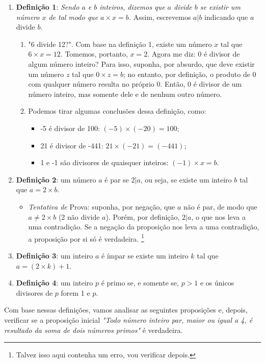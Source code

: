 \documentclass{article}
\begin{document}
\begin{enumerate}
    \item \textbf{Definição 1}: \emph{Sendo $a$ e $b$ inteiros, dizemos que $a$ divide $b$ se existir um número $x$ de tal modo que $ a \times x = b $.} Assim, escrevemos $a|b$ indicando que $a$ divide $b$.
    \begin{enumerate}
    \item "6 divide 12?". Com base na definição 1, existe um número $x$ tal que $6 \times x = 12$. Tomemos, portanto, $x = 2$. Agora me diz: 0 é divisor de algum número inteiro? Para isso, suponha, por absurdo, que deve existir um número $z$ tal que $ 0 \times z = b$; no entanto, por definição, o produto de 0 com qualquer número resulta no próprio 0. Então, 0 é divisor de um número inteiro, mas somente dele e de nenhum outro número.
    \item Podemos tirar algumas conclusões dessa definição, como:
    \begin{itemize}
        \item -5 é divisor de 100: $(-5) \times (-20) = 100$;
        \item 21 é divisor de -441: $21 \times (-21) = (-441)$;
        \item 1 e -1 são divisores de quaisquer inteiros: $(-1) \times x = b$.
    \end{itemize}
    \end{enumerate}
    
    \item \textbf{Definição 2}: um número $a$ é par se $2|a$, ou seja, se existe um inteiro $b$ tal que $a = 2 \times b$.
    \begin{itemize}
        \item \emph{Tentativa de} Prova: suponha, por negação, que $a$ não é par, de modo que $ a \ne 2 \times b$ (2 não divide $a$). Porém, por definição, $2|a$, o que nos leva a uma contradição. Se a negação da proposição nos leva a uma contradição, a proposição por si só é verdadeira.
        \footnote{Talvez isso aqui contenha um erro, vou verificar depois.}
    \end{itemize}
    \item \textbf{Definição 3}: um inteiro $a$ é ímpar se existe um inteiro $k$ tal que $a = (2 \times k) + 1$.
    \item \textbf{Definição 4}: um inteiro $p$ é primo se, e somente se, $ p > 1 $ e os únicos divisores de $p$ forem 1 e $p$.
\end{enumerate}

Com base nessas definições, vamos analisar as seguintes proposições e, depois, verificar se a proposição inicial \emph{"Todo número inteiro par, maior ou igual a 4, é resultado da soma de dois números primos"} é verdadeira.
\end{document}
